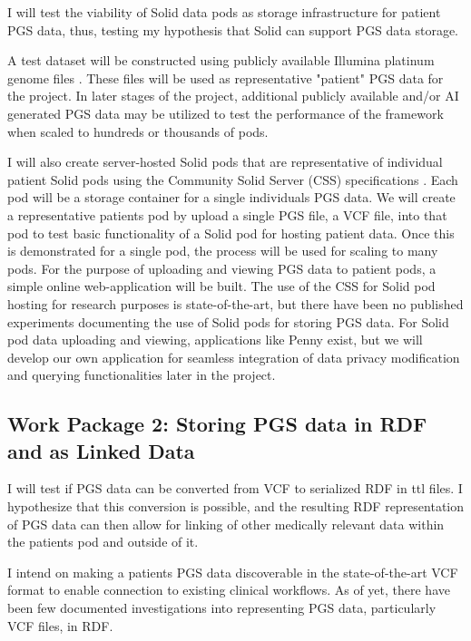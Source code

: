 \documentclass[runningheads]{llncs}
\begin{document}
I will test the viability of Solid data pods as storage infrastructure for patient PGS data, thus, testing my hypothesis that Solid can support PGS data storage. 

A test dataset will be constructed using publicly available Illumina platinum genome files \cite{noauthor_platinum_nodate}. 
These files will be used as representative "patient" PGS data for the project. 
In later stages of the project, additional publicly available and/or AI generated PGS data may be utilized to test the performance of the framework when scaled to hundreds or thousands of pods. 

I will also create server-hosted Solid pods that are representative of individual patient Solid pods using the Community Solid Server (CSS) specifications \cite{css}. 
Each pod will be a storage container for a single individual\textquotesingle s PGS data. 
We will create a representative patient\textquotesingle s pod by upload a single PGS file, a VCF file, into that pod to test basic functionality of a Solid pod for hosting patient data. 
Once this is demonstrated for a single pod, the process will be used for scaling to many pods.
For the purpose of uploading and viewing PGS data to patient pods, a simple online web-application will be built.
The use of the CSS for Solid pod hosting for research purposes is state-of-the-art, but there have been no published experiments documenting the use of Solid pods for storing PGS data. 
For Solid pod data uploading and viewing, applications like Penny \cite{penny} exist, but we will develop our own application for seamless integration of data privacy modification and querying functionalities later in the project. 


\subsection{Work Package 2:  Storing PGS data in RDF and as Linked Data}

I will test if PGS data can be converted from VCF to serialized RDF in ttl files. 
I hypothesize that this conversion is possible, and the resulting RDF representation of PGS data can then allow for linking of other medically relevant data within the patient\textquotesingle s pod and outside of it.

I intend on making a patient\textquotesingle s PGS data discoverable in the state-of-the-art VCF format to enable connection to existing clinical workflows. 
As of yet, there have been few documented investigations into representing PGS data, particularly VCF files, in RDF. 
\end{document}
